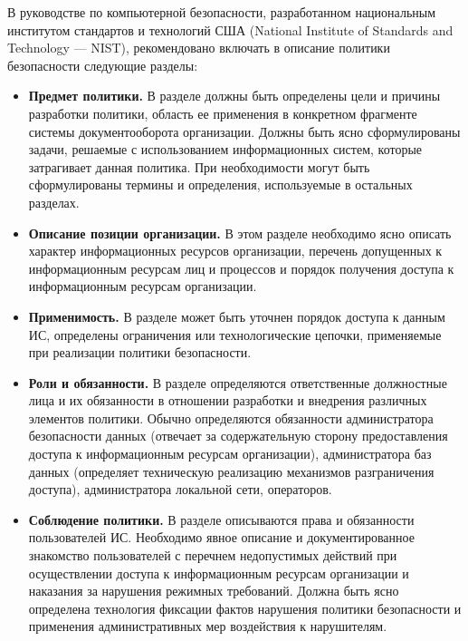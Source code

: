 В руководстве по компьютерной безопасности, разработанном национальным институтом стандартов и технологий
США (National Institute of Standards and Technology — NIST), рекомендовано включать в описание
политики безопасности следующие разделы:
\begin{itemize}
	\item \textbf{Предмет политики.}
        В разделе должны быть определены цели и причины разработки политики, область ее применения
        в конкретном фрагменте системы документооборота организации. Должны быть ясно сформулированы
        задачи, решаемые с использованием информационных систем, которые затрагивает данная политика.
        При необходимости могут быть сформулированы термины и определения, используемые в остальных разделах.

    \item \textbf{Описание позиции организации.}
        В этом разделе необходимо ясно описать характер информационных ресурсов организации, перечень
        допущенных к информационным ресурсам лиц и процессов и порядок получения доступа к информационным
        ресурсам организации.

    \item \textbf{Применимость.}
        В разделе может быть уточнен порядок доступа к данным ИС, определены ограничения или технологические
        цепочки, применяемые при реализации политики безопасности.

    \item \textbf{Роли и обязанности.}
        В разделе определяются ответственные должностные лица и их обязанности в отношении разработки и
        внедрения различных элементов политики. Обычно определяются обязанности администратора безопасности
        данных (отвечает за содержательную сторону предоставления доступа к информационным ресурсам организации),
        администратора баз данных (определяет техническую реализацию механизмов разграничения доступа),
        администратора локальной сети, операторов.

    \item \textbf{Соблюдение политики.}
        В разделе описываются права и обязанности пользователей ИС. Необходимо явное описание и документированное
        знакомство пользователей с перечнем недопустимых действий при осуществлении доступа к информационным ресурсам
        организации и наказания за нарушения режимных требований. Должна быть ясно определена технология фиксации
        фактов нарушения политики безопасности и применения административных мер воздействия к нарушителям.
\end{itemize}

